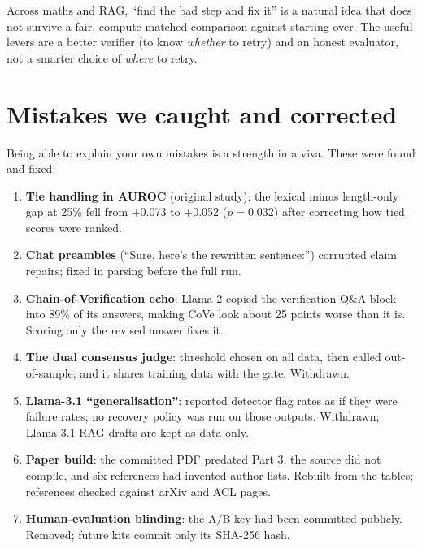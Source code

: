 \documentclass[11pt,a4paper]{article}
\begin{document}
\begin{plain}
Across maths and RAG, ``find the bad step and fix it'' is a natural idea that does not survive a
fair, compute-matched comparison against starting over. The useful levers are a better verifier
(to know \emph{whether} to retry) and an honest evaluator, not a smarter choice of \emph{where} to
retry.
\end{plain}

\section{Mistakes we caught and corrected}\label{sec:integrity}
Being able to explain your own mistakes is a strength in a viva. These were found and fixed:
\begin{enumerate}
\item \textbf{Tie handling in AUROC} (original study): the lexical minus length-only gap at 25\% fell
from +0.073 to +0.052 ($p=0.032$) after correcting how tied scores were ranked.
\item \textbf{Chat preambles} (``Sure, here's the rewritten sentence:'') corrupted claim repairs; fixed in
parsing before the full run.
\item \textbf{Chain-of-Verification echo}: Llama-2 copied the verification Q\&A block into 89\% of its
answers, making CoVe look about 25 points worse than it is. Scoring only the revised answer fixes it.
\item \textbf{The dual consensus judge}: threshold chosen on all data, then called out-of-sample; and it
shares training data with the gate. Withdrawn.
\item \textbf{Llama-3.1 ``generalisation''}: reported detector flag rates as if they were failure rates;
no recovery policy was run on those outputs. Withdrawn; Llama-3.1 RAG drafts are kept as data only.
\item \textbf{Paper build}: the committed PDF predated Part 3, the source did not compile, and six
references had invented author lists. Rebuilt from the tables; references checked against arXiv and
ACL pages.
\item \textbf{Human-evaluation blinding}: the A/B key had been committed publicly. Removed; future kits
commit only its SHA-256 hash.
\end{enumerate}

\end{document}
